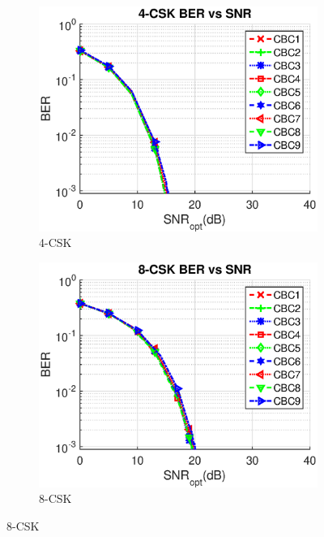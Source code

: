 \documentclass[10pt,letterpaper]{article}
\begin{document}
\begin{figure}[t]
	\centering
		\begin{subfigure}{0.32\textwidth}
		\centering
			\includegraphics[trim={0.0in 0.0in 0.1in 0.3in}, clip=true, width=\textwidth]{M04_4-CSK_BERvsSNR.eps}
			\caption{4-CSK}
			\label{fig4SNR}
		\end{subfigure}
		\hfill
		\begin{subfigure}{0.32\textwidth}
		\centering
			\includegraphics[trim={0.0in 0.0in 0.1in 0.3in}, clip=true, width=\textwidth]{M08_8-CSK_BERvsSNR.eps}
			\caption{8-CSK}
			\label{fig8SNR}
		\end{subfigure}

\end{figure}
\end{document}
